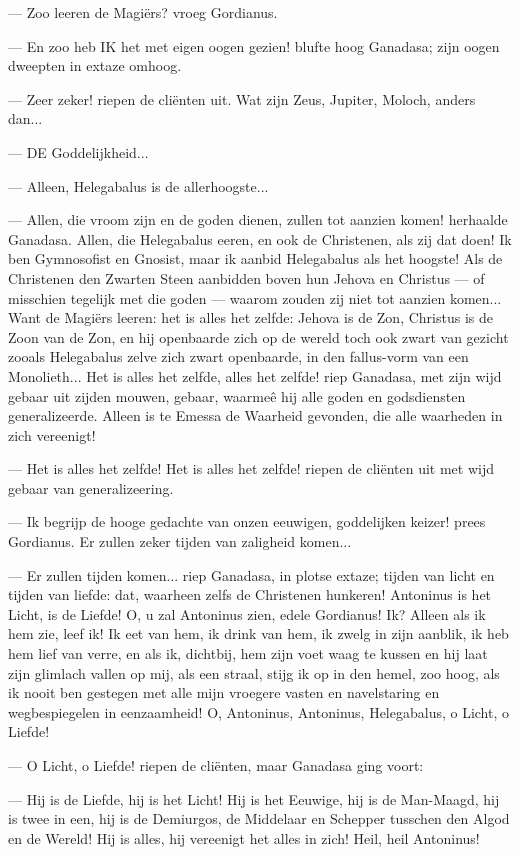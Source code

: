 \documentclass[a4paper, 12pt, oneside, dutch]{article}
\begin{document}
--- Zoo leeren de Magiërs? vroeg Gordianus.

--- En zoo heb IK het met eigen oogen gezien! blufte hoog Ganadasa; zijn oogen dweepten in extaze omhoog.

--- Zeer zeker! riepen de cliënten uit. Wat zijn Zeus, Jupiter, Moloch, anders dan...

--- DE Goddelijkheid...

--- Alleen, Helegabalus is de allerhoogste...

--- Allen, die vroom zijn en de goden dienen, zullen tot aanzien komen! herhaalde Ganadasa. Allen, die Helegabalus eeren, en ook de Christenen, als zij dat doen! Ik ben Gymnosofist en Gnosist, maar ik aanbid Helegabalus als het hoogste! Als de Christenen den Zwarten Steen aanbidden boven hun Jehova en Christus --- of misschien tegelijk met die goden --- waarom zouden zij niet tot aanzien komen... Want de Magiërs leeren: het is alles het zelfde: Jehova is de Zon, Christus is de Zoon van de Zon, en hij openbaarde zich op de wereld toch ook zwart van gezicht zooals Helegabalus zelve zich zwart openbaarde, in den fallus-vorm van een Monolieth... Het is alles het zelfde, alles het zelfde! riep Ganadasa, met zijn wijd gebaar uit zijden mouwen, gebaar, waarmeê hij alle goden en godsdiensten generalizeerde. Alleen is te Emessa de Waarheid gevonden, die alle waarheden in zich vereenigt!

--- Het is alles het zelfde! Het is alles het zelfde! riepen de cliënten uit met wijd gebaar van generalizeering.

--- Ik begrijp de hooge gedachte van onzen eeuwigen, goddelijken keizer! prees Gordianus. Er zullen zeker tijden van zaligheid komen...

--- Er zullen tijden komen... riep Ganadasa, in plotse extaze; tijden van licht en tijden van liefde: dat, waarheen zelfs de Christenen hunkeren! Antoninus is het Licht, is de Liefde! O, u zal Antoninus zien, edele Gordianus! Ik? Alleen als ik hem zie, leef ik! Ik eet van hem, ik drink van hem, ik zwelg in zijn aanblik, ik heb hem lief van verre, en als ik, dichtbij, hem zijn voet waag te kussen en hij laat zijn glimlach vallen op mij, als een straal, stijg ik op in den hemel, zoo hoog, als ik nooit ben gestegen met alle mijn vroegere vasten en navelstaring en wegbespiegelen in eenzaamheid! O, Antoninus, Antoninus, Helegabalus, o Licht, o Liefde!

--- O Licht, o Liefde! riepen de cliënten, maar Ganadasa ging voort:

--- Hij is de Liefde, hij is het Licht! Hij is het Eeuwige, hij is de Man-Maagd, hij is twee in een, hij is de Demiurgos, de Middelaar en Schepper tusschen den Algod en de Wereld! Hij is alles, hij vereenigt het alles in zich! Heil, heil Antoninus!
\end{document}
